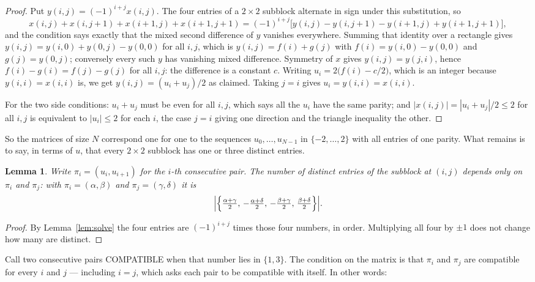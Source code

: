 \documentclass[11pt,a4paper]{article}
\theoremstyle{plain}
\newtheorem{lemma}[theorem]{Lemma}
\theoremstyle{definition}
\begin{document}
\begin{proof}
Put $y(i,j)=(-1)^{i+j}x(i,j)$. The four entries of a $2\times2$ subblock alternate in sign
under this substitution, so
\[
x(i,j)+x(i,j{+}1)+x(i{+}1,j)+x(i{+}1,j{+}1)
=(-1)^{i+j}\bigl[y(i,j)-y(i,j{+}1)-y(i{+}1,j)+y(i{+}1,j{+}1)\bigr],
\]
and the condition says exactly that the mixed second difference of $y$ vanishes everywhere.
Summing that identity over a rectangle gives
$y(i,j)=y(i,0)+y(0,j)-y(0,0)$ for all $i,j$, which is $y(i,j)=f(i)+g(j)$ with
$f(i)=y(i,0)-y(0,0)$ and $g(j)=y(0,j)$; conversely every such $y$ has vanishing mixed
difference. Symmetry of $x$ gives $y(i,j)=y(j,i)$, hence $f(i)-g(i)=f(j)-g(j)$ for all $i,j$:
the difference is a constant $c$. Writing $u_i=2\bigl(f(i)-c/2\bigr)$, which is an integer
because $y(i,i)=x(i,i)$ is, we get $y(i,j)=(u_i+u_j)/2$ as claimed. Taking $j=i$ gives
$u_i=y(i,i)=x(i,i)$.

For the two side conditions: $u_i+u_j$ must be even for all $i,j$, which says all the $u_i$ have
the same parity; and $|x(i,j)|=|u_i+u_j|/2\le2$ for all $i,j$ is equivalent to $|u_i|\le2$
for each $i$, the case $j=i$ giving one direction and the triangle inequality the other.
\end{proof}

So the matrices of size $N$ correspond one for one to the sequences $u_0,\dots,u_{N-1}$ in
$\{-2,\dots,2\}$ with all entries of one parity. What remains is to say, in terms of $u$,
that every $2\times2$ subblock has one or three distinct entries.

\begin{lemma}\label{lem:block}
Write $\pi_i=(u_i,u_{i+1})$ for the $i$-th consecutive pair. The number of distinct entries of
the subblock at $(i,j)$ depends only on $\pi_i$ and $\pi_j$: with $\pi_i=(\alpha,\beta)$ and
$\pi_j=(\gamma,\delta)$ it is
\[
\Bigl|\Bigl\{\tfrac{\alpha+\gamma}{2},\,-\tfrac{\alpha+\delta}{2},\,
-\tfrac{\beta+\gamma}{2},\,\tfrac{\beta+\delta}{2}\Bigr\}\Bigr| .
\]
\end{lemma}

\begin{proof}
By Lemma~\ref{lem:solve} the four entries are $(-1)^{i+j}$ times those four numbers, in
order. Multiplying all four by $\pm1$ does not change how many are distinct.
\end{proof}

Call two consecutive pairs COMPATIBLE when that number lies in $\{1,3\}$. The condition on the
matrix is that $\pi_i$ and $\pi_j$ are compatible for every $i$ and $j$ --- including $i=j$,
which asks each pair to be compatible with itself. In other words:
\end{document}
